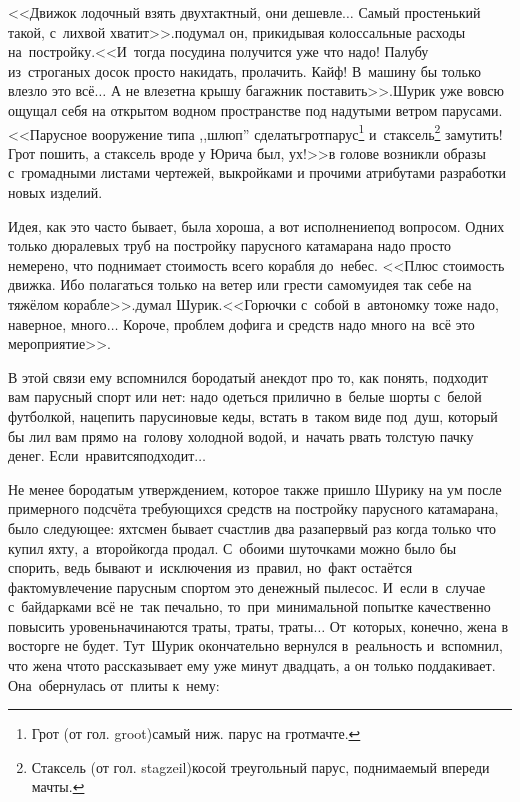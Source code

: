 {<<Движок лодочный взять двухтактный, они дешевле$\ldots$ Самый простенький такой, с~лихвой хватит>>.\mdash подумал он, прикидывая колоссальные расходы на~постройку.\mdash <<И~тогда посудина получится уже что надо! Палубу из~строганых досок просто накидать, пролачить. Кайф! В~машину бы только влезло это всё$\ldots$ А не влезет\mdash на крышу багажник поставить>>.\mdash Шурик уже вовсю ощущал себя на открытом водном пространстве под надутыми ветром парусами.\mdash <<Парусное вооружение типа ,,шлюп'' сделать\mdash грот\sdash парус\footnote{Грот (от гол. groot)\mdash самый ниж. парус на грот\sdash мачте.} и~стаксель\footnote{Стаксель (от гол. stagzeil)\mdash косой треугольный парус, поднимаемый впереди мачты.} замутить! Грот пошить, а стаксель вроде у Юрича был, ух!>>\mdash в голове возникли образы с~громадными листами чертежей, выкройками и прочими атрибутами разработки новых изделий.

Идея, как это часто бывает, была хороша, а вот исполнение\mdash под вопросом. Одних только дюралевых труб на постройку парусного катамарана надо просто немерено, что поднимает стоимость всего корабля до~небес. <<Плюс стоимость движка. Ибо полагаться только на ветер или грести самому\mdash идея так себе на тяжёлом корабле>>.\mdash думал Шурик.\mdash <<Горючки с~собой в~автономку тоже надо, наверное, много$\ldots$ Короче, проблем дофига и средств надо много на~всё это мероприятие>>. 

В этой связи ему вспомнился бородатый анекдот про то, как понять, подходит вам парусный спорт или нет: надо одеться прилично в~белые шорты с~белой футболкой, нацепить парусиновые кеды, встать в~таком виде под~душ, который бы лил вам прямо на~голову холодной водой, и~начать рвать толстую пачку денег. Если~нравится\mdash подходит$\ldots$

Не менее бородатым утверждением, которое также пришло Шурику на ум после примерного подсчёта требующихся средств на постройку парусного катамарана, было следующее: яхтсмен бывает счастлив два раза\mdash первый раз когда только что купил яхту, а~второй\mdash когда продал. С~обоими шуточками можно было бы спорить, ведь бывают и~исключения из~правил, но~факт остаётся фактом\mdash увлечение парусным спортом это денежный пылесос. И~если в~случае с~байдарками всё не~так печально, то~при~минимальной попытке качественно повысить уровень\mdash начинаются траты, траты, траты$\ldots$ От~которых, конечно, жена в восторге не будет. Тут~Шурик окончательно вернулся в~реальность и~вспомнил, что жена что\sdash то рассказывает ему уже минут двадцать, а он только поддакивает. Она~обернулась от~плиты к~нему:

}
